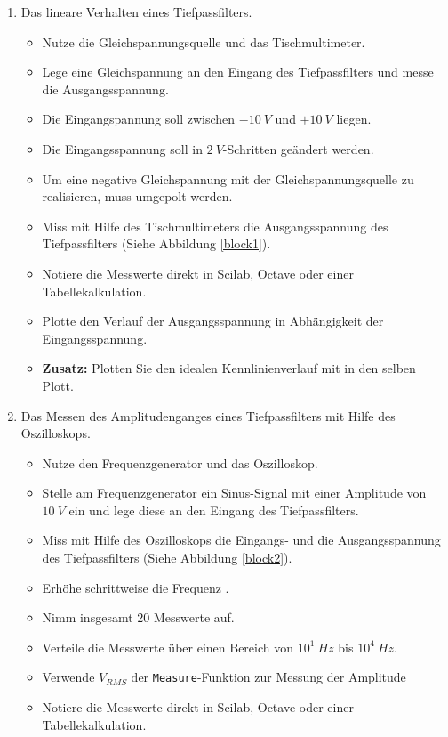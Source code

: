 \begin{enumerate}
	\item Das lineare Verhalten eines Tiefpassfilters.
		\begin{itemize}
			\item Nutze die Gleichspannungsquelle und das Tischmultimeter.
			\item Lege eine Gleichspannung an den Eingang des Tiefpassfilters und messe die Ausgangsspannung.
    		\item Die Eingangspannung soll zwischen $-10~V$ und $+10~V$ liegen.
    		\item Die Eingangsspannung soll in $2~V$-Schritten geändert werden.
    		\item Um eine negative Gleichspannung mit der Gleichspannungsquelle zu realisieren, muss umgepolt werden.
    		\item Miss mit Hilfe des Tischmultimeters die Ausgangsspannung des Tiefpassfilters (Siehe Abbildung \ref{block1}).
    		\item Notiere die Messwerte direkt in Scilab, Octave oder einer Tabellekalkulation.
			\item Plotte den Verlauf der Ausgangsspannung in Abhängigkeit der Eingangsspannung.
			\item \textbf{Zusatz:} Plotten Sie den idealen Kennlinienverlauf mit in den selben Plott.
			\end{itemize}	
	\item Das Messen des Amplitudenganges eines Tiefpassfilters mit Hilfe des Oszilloskops.
		\begin{itemize}
			\item Nutze den Frequenzgenerator und das Oszilloskop.
			\item Stelle am Frequenzgenerator ein Sinus-Signal mit einer Amplitude von $10~V$ ein und lege diese an den Eingang des Tiefpassfilters.
			\item Miss mit Hilfe des Oszilloskops die Eingangs- und die Ausgangsspannung des Tiefpassfilters (Siehe Abbildung \ref{block2}).
			\item Erhöhe schrittweise die Frequenz .
			\item Nimm insgesamt 20 Messwerte auf.
			\item Verteile die Messwerte über einen Bereich von $10^1~Hz$ bis $10^4~Hz$.
			\item Verwende \texttt{$V_{RMS}$} der \texttt{Measure}-Funktion zur Messung der Amplitude
			\item Notiere die Messwerte direkt in Scilab, Octave oder einer Tabellekalkulation.

\end{itemize}
\end{enumerate}
